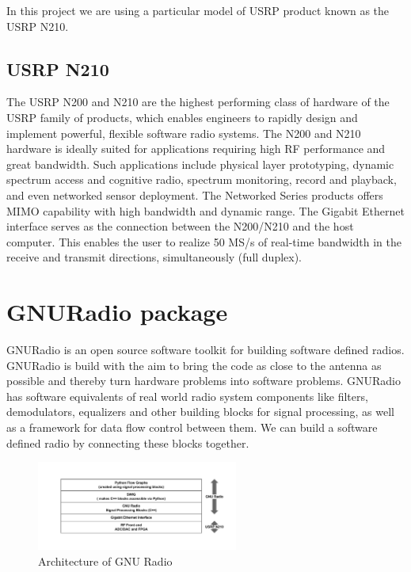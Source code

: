 In this project we are using a particular model of USRP product known as the
USRP N210.

\subsection{USRP N210}

The USRP N200 and N210 are the highest performing class of hardware of the 
USRP family of products, which enables engineers to rapidly design and 
implement powerful, flexible software radio systems. The N200 and N210 
hardware is ideally suited for applications requiring high RF performance and
great bandwidth. Such applications include physical layer prototyping, dynamic
spectrum access and cognitive radio, spectrum monitoring, record and playback,
and even networked sensor deployment. The Networked Series products offers 
MIMO capability with high bandwidth and dynamic range. The Gigabit Ethernet
interface serves as the connection between the N200/N210 and the host 
computer. This enables the user to realize 50 MS/s of real-time bandwidth in 
the receive and transmit directions, simultaneously (full duplex).



\section{GNURadio package}

GNURadio is an open source software toolkit for building software defined 
radios. GNURadio is build with the aim to bring the code as close to the
antenna as possible and thereby turn hardware problems into software problems.
GNURadio has software equivalents of real world radio system components like
filters, demodulators, equalizers and other building blocks for signal
processing, as well as a framework for data flow control between them. We can
build a software defined radio by connecting these blocks together. 

\begin{figure}
\centering
\includegraphics[width=0.59\textwidth]{gnuradio_architecture}
\caption{Architecture of GNU Radio}
\label{gnuradio_architecture}
\end{figure}

